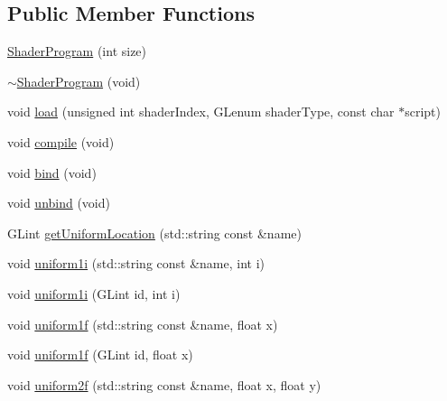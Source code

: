 \subsection*{Public Member Functions}
\begin{DoxyCompactItemize}
\item 
\mbox{\hyperlink{class_beer_engine_1_1_graphics_1_1_shader_program_aee2fd393bbe665f1d6d1d4389242490e}{Shader\+Program}} (int size)
\item 
\mbox{\hyperlink{class_beer_engine_1_1_graphics_1_1_shader_program_adce6fa1e441965862456330f4f3f4de4}{$\sim$\+Shader\+Program}} (void)
\item 
void \mbox{\hyperlink{class_beer_engine_1_1_graphics_1_1_shader_program_ac205d24d3c80e87fed7010acbcb40b33}{load}} (unsigned int shader\+Index, G\+Lenum shader\+Type, const char $\ast$script)
\item 
void \mbox{\hyperlink{class_beer_engine_1_1_graphics_1_1_shader_program_a060e889dea04cc9cb1f746dc1d8ca5b5}{compile}} (void)
\item 
void \mbox{\hyperlink{class_beer_engine_1_1_graphics_1_1_shader_program_afa6beb6d744fa6eae87e41958042aabb}{bind}} (void)
\item 
void \mbox{\hyperlink{class_beer_engine_1_1_graphics_1_1_shader_program_a280b1136661844c2af0bde2ad09f6200}{unbind}} (void)
\item 
G\+Lint \mbox{\hyperlink{class_beer_engine_1_1_graphics_1_1_shader_program_a9a42d998117a60631e154a3791acf802}{get\+Uniform\+Location}} (std\+::string const \&name)
\item 
void \mbox{\hyperlink{class_beer_engine_1_1_graphics_1_1_shader_program_a37a1f053ac9ab67c44063027cc327733}{uniform1i}} (std\+::string const \&name, int i)
\item 
void \mbox{\hyperlink{class_beer_engine_1_1_graphics_1_1_shader_program_a4acc44ee9ecdcc65ba1fef542846ca9d}{uniform1i}} (G\+Lint id, int i)
\item 
void \mbox{\hyperlink{class_beer_engine_1_1_graphics_1_1_shader_program_a41c810862167978320cdb7e4c06e45d4}{uniform1f}} (std\+::string const \&name, float x)
\item 
void \mbox{\hyperlink{class_beer_engine_1_1_graphics_1_1_shader_program_a83768fb4346dd79e97d13055bcc861cb}{uniform1f}} (G\+Lint id, float x)
\item 
void \mbox{\hyperlink{class_beer_engine_1_1_graphics_1_1_shader_program_a83ec2d9185b1e539cf50e9f322ffedd1}{uniform2f}} (std\+::string const \&name, float x, float y)
\item 

\end{DoxyCompactItemize}
